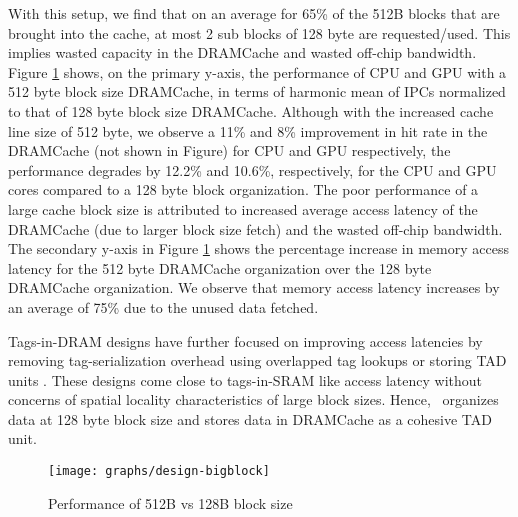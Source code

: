 \par With this setup, we find that on an average for 65\% of the 512B blocks that are brought into the cache, at most 2 sub blocks of 128 byte are requested/used.
This implies wasted capacity in the DRAMCache and wasted off-chip bandwidth. Figure \ref{fig:design-bigblock} shows, on the primary y-axis, the performance of CPU and GPU with a 512 byte block size DRAMCache, in terms of harmonic mean of IPCs normalized to that of 128 byte block size DRAMCache.
Although with the increased cache line size of 512 byte, we observe a 11\% and 8\% improvement in hit rate in the DRAMCache (not shown in Figure) for CPU and GPU respectively, the performance degrades by 12.2\% and 10.6\%, respectively, for the CPU and GPU cores compared to a 128 byte block organization. The poor performance of a large cache block size is attributed to increased average access latency of the DRAMCache (due to larger block size fetch) and the wasted off-chip bandwidth. The secondary y-axis in Figure \ref{fig:design-bigblock} shows the percentage increase in memory access latency for the 512 byte DRAMCache organization over the 128 byte DRAMCache organization. We observe that memory access latency increases by an average of 75\% due to the unused data fetched.
\par Tags-in-DRAM designs have further focused on improving access latencies by removing tag-serialization overhead using overlapped tag lookups \cite{loh-hill} or storing TAD units \cite{alloy}. These designs come close to tags-in-SRAM like access latency without concerns of spatial locality characteristics of large block sizes. 
Hence, \cachename\ organizes data at 128 byte block size and stores data in DRAMCache as a cohesive TAD unit.

\begin{figure}[htbp]
   \texttt{[image: graphs/design-bigblock]}
   \caption{Performance of 512B vs 128B block size}	
   \label{fig:design-bigblock}
\end{figure}

